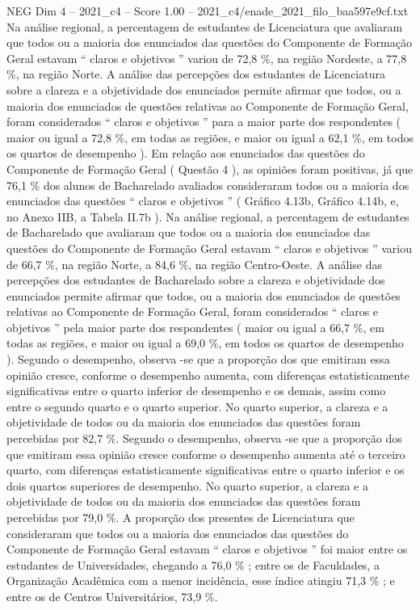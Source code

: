 \begin{textsample}{NEG Dim 4 – 2021\_c4 – Score 1.00 – 2021\_c4/enade\_2021\_filo\_baa597e9cf.txt}
Na análise regional, a percentagem de estudantes de Licenciatura que avaliaram que todos ou a maioria dos enunciados das questões do Componente de Formação Geral estavam “ claros e objetivos ” variou de 72,8 \%, na região Nordeste, a 77,8 \%, na região Norte.
A análise das percepções dos estudantes de Licenciatura sobre a clareza e a objetividade dos enunciados permite afirmar que todos, ou a maioria dos enunciados de questões relativas ao Componente de Formação Geral, foram considerados “ claros e objetivos ” para a maior parte dos respondentes ( maior ou igual a 72,8 \%, em todas as regiões, e maior ou igual a 62,1 \%, em todos os quartos de desempenho ).
Em relação aos enunciados das questões do Componente de Formação Geral ( Questão 4 ), as opiniões foram positivas, já que 76,1 \% dos alunos de Bacharelado avaliados consideraram todos ou a maioria dos enunciados das questões “ claros e objetivos ” ( Gráfico 4.13b, Gráfico 4.14b, e, no Anexo IIB, a Tabela II.7b ).
Na análise regional, a percentagem de estudantes de Bacharelado que avaliaram que todos ou a maioria dos enunciados das questões do Componente de Formação Geral estavam “ claros e objetivos ” variou de 66,7 \%, na região Norte, a 84,6 \%, na região Centro-Oeste.
A análise das percepções dos estudantes de Bacharelado sobre a clareza e objetividade dos enunciados permite afirmar que todos, ou a maioria dos enunciados de questões relativas ao Componente de Formação Geral, foram considerados “ claros e objetivos ” pela maior parte dos respondentes ( maior ou igual a 66,7 \%, em todas as regiões, e maior ou igual a 69,0 \%, em todos os quartos de desempenho ).
Segundo o desempenho, observa -se que a proporção dos que emitiram essa opinião cresce, conforme o desempenho aumenta, com diferenças estatisticamente significativas entre o quarto inferior de desempenho e os demais, assim como entre o segundo quarto e o quarto superior.
No quarto superior, a clareza e a objetividade de todos ou da maioria dos enunciados das questões foram percebidas por 82,7 \%.
Segundo o desempenho, observa -se que a proporção dos que emitiram essa opinião cresce conforme o desempenho aumenta até o terceiro quarto, com diferenças estatisticamente significativas entre o quarto inferior e os dois quartos superiores de desempenho.
No quarto superior, a clareza e a objetividade de todos ou da maioria dos enunciados das questões foram percebidas por 79,0 \%.
A proporção dos presentes de Licenciatura que consideraram que todos ou a maioria dos enunciados das questões do Componente de Formação Geral estavam “ claros e objetivos ” foi maior entre os estudantes de Universidades, chegando a 76,0 \% ; entre os de Faculdades, a Organização Acadêmica com a menor incidência, esse índice atingiu 71,3 \% ; e entre os de Centros Universitários, 73,9 \%.

\end{textsample}
